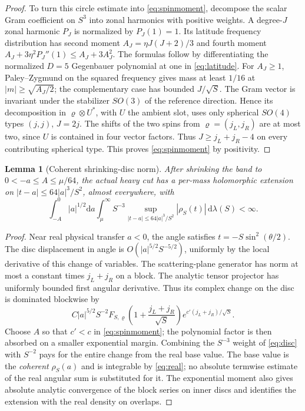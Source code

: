 \documentclass[11pt,a4paper]{article}
\newtheorem{lemma}[theorem]{Lemma}
\theoremstyle{definition}
\theoremstyle{remark}
\newcommand{\dS}{\mathrm{d}}
\begin{document}
\begin{proof}
To turn this circle estimate into \eqref{eq:spinmoment}, decompose the scalar Gram coefficient on $S^3$ into zonal harmonics with positive weights. A degree-$J$ zonal harmonic $P_J$ is normalized by $P_J(1)=1$. Its latitude frequency distribution has second moment
$A_J=\eta J(J+2)/3$ and fourth moment $A_J+3\eta^2P_J''(1)\le A_J+3A_J^2$. The formulas follow by differentiating the normalized $D=5$ Gegenbauer polynomial at one in \eqref{eq:latitude}. For $A_J\ge1$, Paley--Zygmund on the squared frequency gives mass at least $1/16$ at $|m|\ge\sqrt{A_J/2}$; the complementary case has bounded $J/\sqrt S$. The Gram vector is invariant under the stabilizer $SO(3)$ of the reference direction. Hence its decomposition in $\varrho\otimes U^*$, with $U$ the ambient slot, uses only spherical $SO(4)$ types $(j,j)$, $J=2j$. The shifts of the two spins from $\varrho=(j_L,j_R)$ are at most two, since $U$ is contained in four vector factors. Thus $J\ge j_L+j_R-4$ on every contributing spherical type. This proves \eqref{eq:spinmoment} by positivity.
\end{proof}

\begin{lemma}[Coherent shrinking-disc norm]\label{lem:disc}
After shrinking the band to $0<-a\le A\le\mu/64$, the actual heavy cut has a per-mass holomorphic extension on
$|t-a|\le64|a|^3/S^2$, almost everywhere, with
\begin{equation}\label{eq:disc}
 \int_{-A}^0 |a|^{1/2}\dS a\int_\mu^\infty S^{-3}
       \sup_{|t-a|\le64|a|^3/S^2}|\rho_S(t)|\,\dS\lambda(S)<\infty .
\end{equation}
\end{lemma}
\begin{proof}
Near real physical transfer $a<0$, the angle satisfies $t=-S\sin^2(\theta/2)$. The disc displacement in angle is $O(|a|^{5/2}S^{-5/2})$, uniformly by the local derivative of this change of variables. The scattering-plane generator has norm at most a constant times $j_L+j_R$ on a block. The analytic tensor projector has uniformly bounded first angular derivative. Thus its complex change on the disc is dominated blockwise by
\[
 C|a|^{5/2}S^{-2}F_{S,\varrho}
 \left(1+\frac{j_L+j_R}{\sqrt S}\right)
       e^{c'(j_L+j_R)/\sqrt S}.
\]
Choose $A$ so that $c'<c$ in \eqref{eq:spinmoment}; the polynomial factor is then absorbed on a smaller exponential margin. Combining the $S^{-3}$ weight of \eqref{eq:disc} with $S^{-2}$ pays for the entire change from the real base value. The base value is the \emph{coherent} $\rho_S(a)$ and is integrable by \eqref{eq:real}; no absolute termwise estimate of the real angular sum is substituted for it. The exponential moment also gives absolute analytic convergence of the block series on inner discs and identifies the extension with the real density on overlaps.
\end{proof}
\end{document}
